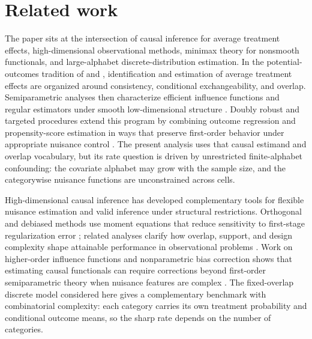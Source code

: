 \section{Related work}

The paper sits at the intersection of causal inference for average treatment effects, high-dimensional observational methods, minimax theory for nonsmooth functionals, and large-alphabet discrete-distribution estimation. In the potential-outcomes tradition of \citet{Rubin1974} and \citet{RosenbaumRubin1983}, identification and estimation of average treatment effects are organized around consistency, conditional exchangeability, and overlap. Semiparametric analyses then characterize efficient influence functions and regular estimators under smooth low-dimensional structure \citep{Hahn1998,HiranoImbensRidder2003,RobinsRotnitzkyZhao1994}. Doubly robust and targeted procedures extend this program by combining outcome regression and propensity-score estimation in ways that preserve first-order behavior under appropriate nuisance control \citep{BangRobins2005,VanDerLaanRubin2006}. The present analysis uses that causal estimand and overlap vocabulary, but its rate question is driven by unrestricted finite-alphabet confounding: the covariate alphabet may grow with the sample size, and the categorywise nuisance functions are unconstrained across cells.

High-dimensional causal inference has developed complementary tools for flexible nuisance estimation and valid inference under structural restrictions. Orthogonal and debiased methods use moment equations that reduce sensitivity to first-stage regularization error \citep{Belloni2017,Chernozhukov2018,Chernozhukov2022}; related analyses clarify how overlap, support, and design complexity shape attainable performance in observational problems \citep{DAmour2021,JinSyrgkanis2025}. Work on higher-order influence functions and nonparametric bias correction shows that estimating causal functionals can require corrections beyond first-order semiparametric theory when nuisance features are complex \citep{Robins2008,Robins2009,Robins2017,LiuMukherjeeNeweyRobins2017,Kennedy2024}. The fixed-overlap discrete model considered here gives a complementary benchmark with combinatorial complexity: each category carries its own treatment probability and conditional outcome means, so the sharp rate depends on the number of categories.

